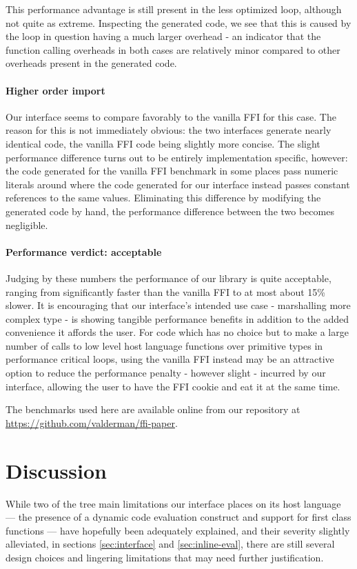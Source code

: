 \documentclass[preprint]{sigplanconf}
\begin{document}
This performance advantage is still present in the less optimized loop,
although not quite as extreme. Inspecting the generated code,
we see that this is caused by the loop in question having a
much larger overhead - an indicator that the function calling overheads in
both cases are relatively minor compared to other overheads present in the
generated code.

\paragraph{Higher order import}
Our interface seems to compare favorably to the vanilla FFI for this case.
The reason for this is not immediately obvious: the two interfaces generate
nearly identical code, the vanilla FFI code being slightly more concise.
The slight performance difference turns out to be entirely implementation
specific, however: the code generated for the vanilla FFI benchmark in some
places pass numeric literals around where the code generated for our
interface instead passes constant references to the same values.
Eliminating this difference by modifying the generated code by hand, the
performance difference between the two becomes negligible.

\paragraph{Performance verdict: acceptable}
Judging by these numbers the performance of our library is quite acceptable,
ranging from significantly faster than the vanilla FFI to at most about 15\%
slower. It is encouraging that our interface's intended use case - marshalling
more complex type - is showing tangible performance benefits in addition to
the added convenience it affords the user.
For code which has no choice but to make a large number of calls to
low level host language functions over primitive types in performance critical
loops, using the vanilla FFI instead may be an attractive option to
reduce the performance penalty - however slight - incurred by our
interface, allowing the user to have the FFI cookie and eat it at the same time.

The benchmarks used here are available online from our repository at
\url{https://github.com/valderman/ffi-paper}.

\section{Discussion}\label{sec:discussion}
While two of the tree main limitations our interface places on its host
language --- the presence of a dynamic code evaluation construct and support for
first class functions --- have hopefully been adequately explained, and their
severity slightly alleviated, in sections \ref{sec:interface} and
\ref{sec:inline-eval}, there are still several design choices and lingering
limitations that may need further justification.
\end{document}
